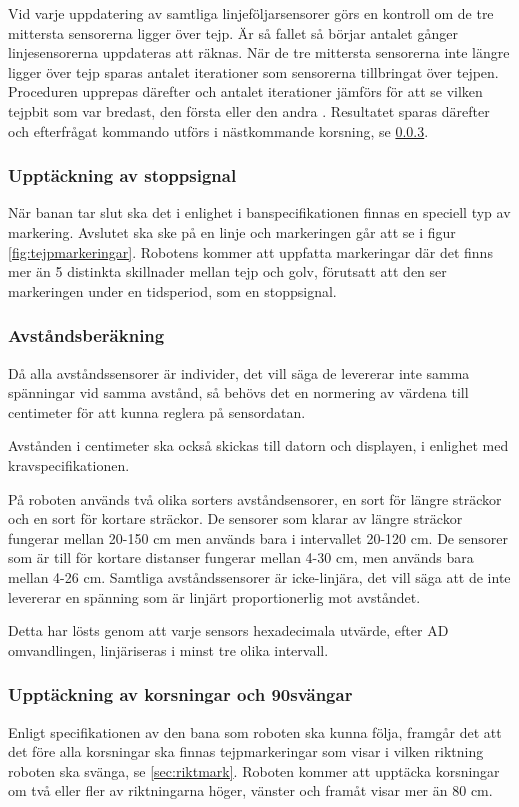 Vid varje uppdatering av samtliga linjeföljarsensorer görs en kontroll om de 
tre mittersta sensorerna ligger över tejp. Är så fallet så börjar antalet 
gånger linjesensorerna uppdateras att räknas. När de tre mittersta sensorerna 
inte längre ligger över tejp sparas antalet iterationer som sensorerna 
tillbringat över tejpen. Proceduren upprepas därefter och antalet iterationer 
jämförs för att se vilken tejpbit som var bredast, den första eller den andra
. Resultatet sparas därefter och efterfrågat kommando utförs i nästkommande 
korsning, se \ref{sec:upptackkorsning}.

\subsubsection{Upptäckning av stoppsignal}
När banan tar slut ska det i enlighet i banspecifikationen finnas en speciell typ av 
markering. Avslutet ska ske på en linje och markeringen går att se i figur \ref{fig:tejpmarkeringar}.
Robotens kommer att uppfatta markeringar där det finns mer än 5 distinkta skillnader mellan tejp och golv, förutsatt att den ser markeringen under en tidsperiod, som en stoppsignal. 

\subsubsection{Avståndsberäkning}
Då alla avståndssensorer är individer, det vill säga de levererar inte samma spänningar vid
samma avstånd, så behövs det en normering av värdena till centimeter för att kunna reglera
på sensordatan. 

Avstånden i centimeter ska också skickas till datorn och displayen, i enlighet med
kravspecifikationen.

På roboten används två olika sorters avståndsensorer, en sort för längre sträckor och en sort för
kortare sträckor. De sensorer som klarar av längre sträckor fungerar mellan 20-150 cm men 
används bara i intervallet 20-120 cm. De sensorer som är till för kortare distanser fungerar mellan 4-30 cm,
 men används bara mellan 4-26 cm. Samtliga avståndssensorer är icke-linjära, det vill säga att de 
 inte levererar en spänning som är linjärt proportionerlig mot avståndet.

Detta har lösts genom att varje sensors hexadecimala utvärde, efter AD omvandlingen, linjäriseras i minst 
tre olika intervall.

\subsubsection{Upptäckning av korsningar och 90\degree svängar}
\label{sec:upptackkorsning}
Enligt specifikationen av den bana som roboten ska kunna följa, framgår det 
att det före alla korsningar ska finnas tejpmarkeringar som visar i vilken 
riktning roboten ska svänga, se \ref{sec:riktmark}. Roboten kommer att 
upptäcka korsningar om två eller fler av riktningarna höger, vänster och framåt visar 
mer än 80 cm.

